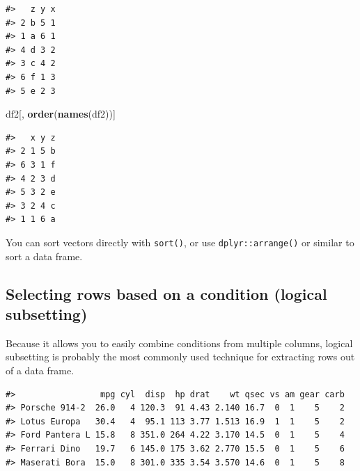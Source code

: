 \documentclass[]{book}
\newenvironment{Shaded}{\begin{snugshade}}{\end{snugshade}}
\newcommand{\KeywordTok}[1]{\textcolor[rgb]{0.13,0.29,0.53}{\textbf{#1}}}
\newcommand{\DecValTok}[1]{\textcolor[rgb]{0.00,0.00,0.81}{#1}}
\newcommand{\StringTok}[1]{\textcolor[rgb]{0.31,0.60,0.02}{#1}}
\newcommand{\OperatorTok}[1]{\textcolor[rgb]{0.81,0.36,0.00}{\textbf{#1}}}
\newcommand{\NormalTok}[1]{#1}
\theoremstyle{definition}
\theoremstyle{definition}
\theoremstyle{definition}
\theoremstyle{remark}
\begin{document}
\begin{Shaded}
\end{Shaded}

\begin{verbatim}
#>   z y x
#> 2 b 5 1
#> 1 a 6 1
#> 4 d 3 2
#> 3 c 4 2
#> 6 f 1 3
#> 5 e 2 3
\end{verbatim}

\begin{Shaded}
\begin{Highlighting}[]
\NormalTok{df2[, }\KeywordTok{order}\NormalTok{(}\KeywordTok{names}\NormalTok{(df2))]}
\end{Highlighting}
\end{Shaded}

\begin{verbatim}
#>   x y z
#> 2 1 5 b
#> 6 3 1 f
#> 4 2 3 d
#> 5 3 2 e
#> 3 2 4 c
#> 1 1 6 a
\end{verbatim}

You can sort vectors directly with \texttt{sort()}, or use
\texttt{dplyr::arrange()} or similar to sort a data frame.

\subsection{Selecting rows based on a condition (logical
subsetting)}\label{selecting-rows-based-on-a-condition-logical-subsetting}

Because it allows you to easily combine conditions from multiple
columns, logical subsetting is probably the most commonly used technique
for extracting rows out of a data frame.

\begin{Shaded}
\end{Shaded}

\begin{verbatim}
#>                 mpg cyl  disp  hp drat    wt qsec vs am gear carb
#> Porsche 914-2  26.0   4 120.3  91 4.43 2.140 16.7  0  1    5    2
#> Lotus Europa   30.4   4  95.1 113 3.77 1.513 16.9  1  1    5    2
#> Ford Pantera L 15.8   8 351.0 264 4.22 3.170 14.5  0  1    5    4
#> Ferrari Dino   19.7   6 145.0 175 3.62 2.770 15.5  0  1    5    6
#> Maserati Bora  15.0   8 301.0 335 3.54 3.570 14.6  0  1    5    8
\end{verbatim}
\end{document}
